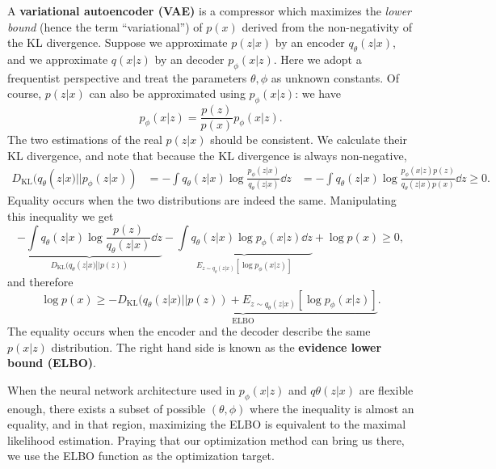 \documentclass[hyperref, a4paper, 12pt]{report}
\newcommand*{\concept}[1]{{\textbf{#1}}}
\def\\{}%
\def\mathbb#1{#1}%
\begin{document}
A \concept{variational autoencoder (VAE)} is a compressor which maximizes the \emph{lower bound}
(hence the term ``variational'') of $p(x)$ derived from the non-negativity of the KL divergence.
Suppose we approximate $p(z|x)$ by an encoder $q_\theta(z | x)$,
and we approximate $q(x|z)$ by an decoder $p_\phi(x | z)$.
Here we adopt a frequentist perspective and treat the parameters $\theta, \phi$ as unknown constants.
Of course, $p(z | x)$ can also be approximated using $p_\phi(x | z)$: we have 
\begin{equation}
    p_\phi(x | z) = \frac{p(z)}{p(x)} p_\phi(x | z).
\end{equation}
The two estimations of the real $p(z | x)$ should be consistent.
We calculate their KL divergence, and note that because the KL divergence is always non-negative,
\begin{equation}
    \begin{aligned}
        D_{\text{KL}}(q_\theta(z|x) || p_\phi(z|x)) &= - \int q_\theta(z|x) \log \frac{p_\phi(z|x)}{q_\theta(z|x)} \dd{z} \\
        &= - \int q_\theta(z|x) \log \frac{p_\phi(x|z) p(z)}{q_\theta(z|x) p(x)} \dd{z} \geq 0.
    \end{aligned}
\end{equation} 
Equality occurs when the two distributions are indeed the same.
Manipulating this inequality we get 
\[
    \underbrace{- \int q_\theta(z|x) \log \frac{p(z)}{q_\theta(z|x)} \dd{z}}_{D_{\text{KL}}(q_\theta(z|x) ||p(z))} - \underbrace{\int q_\theta(z|x)  \log p_\phi(x|z) \dd{z}}_{\mathbb{E}_{z\sim q_\theta(z|x)}[\log p_\phi(x|z)]} + \log p(x) \geq 0,
\]
and therefore 
\begin{equation}
    \log p(x) \geq \underbrace{- D_{\text{KL}}(q_\theta(z|x) ||p(z)) + \mathbb{E}_{z\sim q_\theta(z|x)}[\log p_\phi(x|z)]}_{\text{ELBO}}.
    \label{eq:loss.vae.gaussian.elbo}
\end{equation}
The equality occurs when the encoder and the decoder describe the same $p(x|z)$ distribution.
The right hand side is known as the \concept{evidence lower bound (ELBO)}.

When the neural network architecture used in $p_\phi(x|z)$ and $q\theta(z|x)$ are flexible enough,
there exists a subset of possible $(\theta, \phi)$ where the inequality is almost an equality,
and in that region, maximizing the ELBO is equivalent to the maximal likelihood estimation.
Praying that our optimization method can bring us there,
we use the ELBO function as the optimization target.
\end{document}
